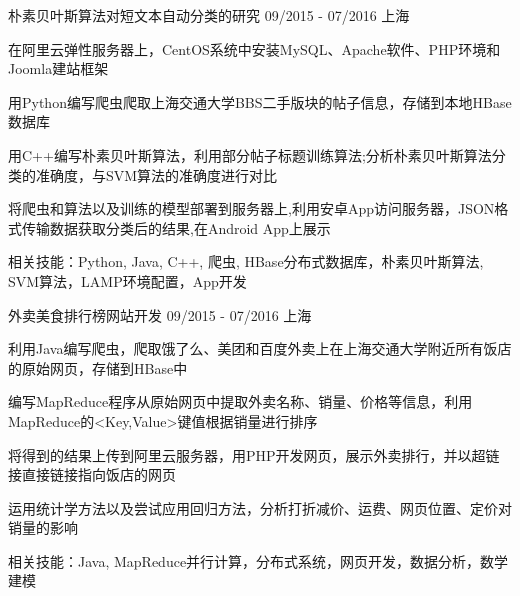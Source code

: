 \vspace{-5pt}
\begin{cventries}

  \cventry
    { } %
    { 朴素贝叶斯算法对短文本自动分类的研究} %
    {09/2015 - 07/2016} %
    {上海} %
    {
    \vspace{-8pt}
      \begin{cvitems} %
        \item {在阿里云弹性服务器上，CentOS系统中安装MySQL、Apache软件、PHP环境和Joomla建站框架}
        \item {用Python编写爬虫爬取上海交通大学BBS二手版块的帖子信息，存储到本地HBase数据库}
        \item{用C++编写朴素贝叶斯算法，利用部分帖子标题训练算法;分析朴素贝叶斯算法分类的准确度，与SVM算法的准确度进行对比}
        \item{将爬虫和算法以及训练的模型部署到服务器上,利用安卓App访问服务器，JSON格式传输数据获取分类后的结果,在Android App上展示}
        \item{相关技能：Python, Java, C++,  爬虫, HBase分布式数据库，朴素贝叶斯算法, SVM算法，LAMP环境配置，App开发}
      \end{cvitems}
    }
\vspace{5pt}
  \cventry
    {} %
    {外卖美食排行榜网站开发} %
    {09/2015 - 07/2016} %
    {上海} %
    {
    \vspace{-8pt}
      \begin{cvitems} %
        \item {利用Java编写爬虫，爬取饿了么、美团和百度外卖上在上海交通大学附近所有饭店的原始网页，存储到HBase中}
        \item {编写MapReduce程序从原始网页中提取外卖名称、销量、价格等信息，利用MapReduce的<Key,Value>键值根据销量进行排序}
        \item {将得到的结果上传到阿里云服务器，用PHP开发网页，展示外卖排行，并以超链接直接链接指向饭店的网页}
        \item {运用统计学方法以及尝试应用回归方法，分析打折减价、运费、网页位置、定价对销量的影响}
        \item {相关技能：Java, MapReduce并行计算，分布式系统，网页开发，数据分析，数学建模}
      \end{cvitems}
    }


\end{cventries}
